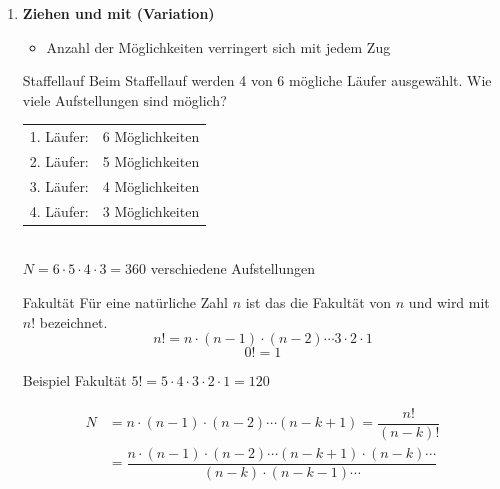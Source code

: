 \begin{note}
\begin{enumerate}[leftmargin=*]
    \item [2)] {
        \textcolor{myb}{\textbf{Ziehen  und mit  (Variation)}}
        \begin{itemize}[leftmargin=*]
            \item Anzahl der Möglichkeiten verringert sich mit jedem Zug
        \end{itemize}
        \begin{Example}{Staffellauf}{}
            Beim Staffellauf werden 4 von 6 mögliche Läufer ausgewählt. Wie viele Aufstellungen sind möglich? \\[1.0ex]
            \begin{tabularx}{0.5\linewidth}{X X}
                1. Läufer: & 6 Möglichkeiten\\
                2. Läufer: & 5 Möglichkeiten\\
                3. Läufer: & 4 Möglichkeiten\\
                4. Läufer: & 3 Möglichkeiten\\
            \end{tabularx}\\[1.5ex]
            $N = 6 \cdot 5 \cdot 4 \cdot 3 = 360$ verschiedene Aufstellungen
        \end{Example}
        \begin{Definition}{Fakultät}{}
            Für eine natürliche Zahl $n$ ist das  die Fakultät von $n$ und wird mit $n!$ bezeichnet.\\[1.0ex]
            \[
                n! = n \cdot (n - 1) \cdot (n - 2) \cdots 3 \cdot 2 \cdot 1
            \]
            \[
                0! = 1
            \]
            \begin{Example}{Beispiel Fakultät}{}
                $5! = 5 \cdot 4 \cdot 3 \cdot 2 \cdot 1 = 120$           
            \end{Example}
        \end{Definition}
        \begin{align*}
            N &= n \cdot (n - 1) \cdot (n - 2) \cdots (n - k  + 1) = \dfrac{n!}{(n - k)!} \\[1.0ex]
              &= \dfrac{n \cdot (n - 1) \cdot (n - 2) \cdots (n - k + 1) \cdot (n - k) \cdots}{(n - k) \cdot (n - k - 1) \cdots}
        \end{align*}
}
\end{enumerate}
\end{note}
